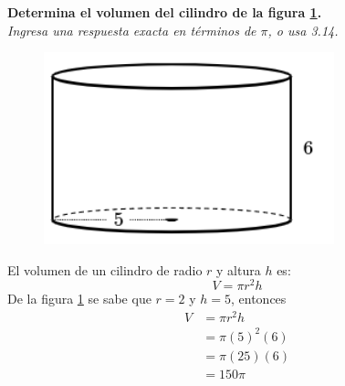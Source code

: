 \question[10] \textbf{Determina el volumen del cilindro de la figura \ref{fig:vol_cil_10}.}\\
\textit{Ingresa una respuesta exacta en términos de $\pi$, o usa 3.14.}

\begin{minipage}{0.3\linewidth}
    \begin{figure}[H]
        \begin{center}
            \includegraphics[width=0.75\textwidth]{../images/vol_cil_10.png}
        \end{center}
        \caption{}
        \label{fig:vol_cil_10}
    \end{figure}
\end{minipage}
\begin{minipage}{0.7\linewidth}
    \begin{solutionbox}{6cm}        El volumen de un cilindro de radio $r$ y altura $h$ es:
        \begin{equation*}
            V = \pi r^2 h
        \end{equation*}
        De la figura \ref{fig:vol_cil_10} se sabe que $r=2$ y $h=5$, entonces
        \begin{equation*}
            \begin{split}
                V & = \pi r^2 h\\
                & = \pi (5)^2 (6)\\
                & = \pi (25) (6)\\
                & = 150\pi
            \end{split}
        \end{equation*}
    \end{solutionbox}
\end{minipage}